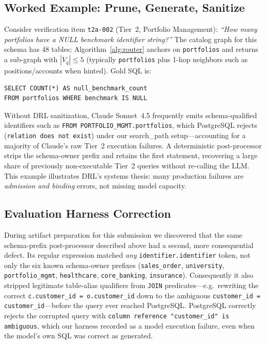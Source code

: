 \documentclass[twocolumn]{svjour3}
\begin{document}
\subsection{Worked Example: Prune, Generate, Sanitize}
\label{sec:example}

Consider verification item \texttt{t2a-002} (Tier~2, Portfolio Management):
\emph{``How many portfolios have a NULL benchmark identifier string?''}
The catalog graph for this schema has 48 tables; Algorithm~\ref{alg:router} anchors on \texttt{portfolios} and returns a sub-graph with $|V_q|\le 5$ (typically \texttt{portfolios} plus 1-hop neighbors such as positions/accounts when hinted).
Gold SQL is:
\begin{lstlisting}[language={}, basicstyle=\footnotesize\ttfamily, breaklines=true, frame=single, backgroundcolor=\color{gray!5}, rulecolor=\color{gray!40}]
SELECT COUNT(*) AS null_benchmark_count
FROM portfolios WHERE benchmark IS NULL
\end{lstlisting}
Without DRL sanitization, Claude Sonnet~4.5 frequently emits schema-qualified identifiers such as \texttt{FROM PORTFOLIO\_MGMT.portfolios}, which PostgreSQL rejects (\texttt{relation does not exist}) under our search\_path setup---accounting for a majority of Claude's raw Tier~2 execution failures.
A deterministic post-processor strips the schema-owner prefix and retains the first statement, recovering a large share of previously non-executable Tier~2 queries without re-calling the LLM.
This example illustrates DRL's systems thesis: many production failures are \emph{admission and binding} errors, not missing model capacity.

\subsection{Evaluation Harness Correction}
\label{sec:harness-fix}

During artifact preparation for this submission we discovered that the same schema-prefix post-processor described above had a second, more consequential defect.
Its regular expression matched \emph{any} \texttt{identifier.identifier} token, not only the six known schema-owner prefixes (\texttt{sales\_order}, \texttt{university}, \texttt{portfolio\_mgmt}, \texttt{healthcare}, \texttt{core\_banking}, \texttt{insurance}).
Consequently it also stripped legitimate table-alias qualifiers from \texttt{JOIN} predicates---e.g.\ rewriting the correct \texttt{c.customer\_id = o.customer\_id} down to the ambiguous \texttt{customer\_id = customer\_id}---before the query ever reached PostgreSQL.
PostgreSQL correctly rejects the corrupted query with \texttt{column reference "customer\_id" is ambiguous}, which our harness recorded as a model execution failure, even when the model's own SQL was correct as generated.
\end{document}

